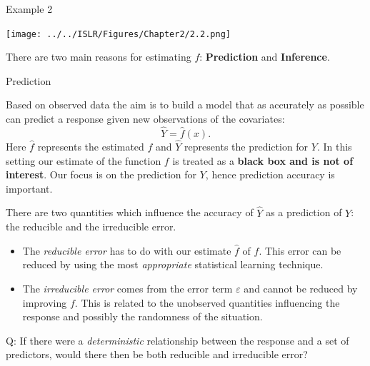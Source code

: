 \documentclass[ignorenonframetext,]{beamer}
\providecommand{\tightlist}{%
  \setlength{\itemsep}{0pt}\setlength{\parskip}{0pt}}
\begin{document}
\begin{frame}{Example 2}

\texttt{[image: ../../ISLR/Figures/Chapter2/2.2.png]}

\end{frame}

\begin{frame}

There are two main reasons for estimating \(f\): \textbf{Prediction} and
\textbf{Inference}.

\end{frame}

\begin{frame}

\begin{block}{Prediction}

Based on observed data the aim is to build a model that as accurately as
possible can predict a response given new observations of the
covariates: \[\hat{Y} = \hat{f}(x).\] Here \(\hat{f}\) represents the
estimated \(f\) and \(\hat{Y}\) represents the prediction for \(Y\). In
this setting our estimate of the function \(f\) is treated as a
\textbf{black box and is not of interest}. Our focus is on the
prediction for \(Y\), hence prediction accuracy is important.

\end{block}

\end{frame}

\begin{frame}

There are two quantities which influence the accuracy of \(\hat{Y}\) as
a prediction of \(Y\): the reducible and the irreducible error.

\begin{itemize}
\tightlist
\item
  The \emph{reducible error} has to do with our estimate \(\hat{f}\) of
  \(f\). This error can be reduced by using the most \emph{appropriate}
  statistical learning technique.
\item
  The \emph{irreducible error} comes from the error term \(\varepsilon\)
  and cannot be reduced by improving \(f\). This is related to the
  unobserved quantities influencing the response and possibly the
  randomness of the situation.
\end{itemize}

\begin{block}{Q: If there were a \emph{deterministic} relationship
between the response and a set of predictors, would there then be both
reducible and irreducible error?}

\end{block}

\end{frame}
\end{document}
